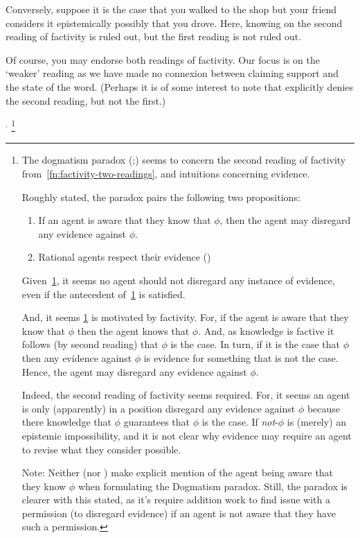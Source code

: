 \begin{note}
{    Conversely, suppose it is the case that you walked to the shop but your friend considers it epistemically possibly that you drove.
    Here, knowing on the second reading of factivity is ruled out, but the first reading is not ruled out.

    Of course, you may endorse both readings of factivity.
    Our focus is on the `weaker' reading as we have made no connexion between claiming support and the state of the word.
    (Perhaps it is of some interest to note that \citeauthor{Dretske:1970to} explicitly denies the second reading, but not the first.)
  }\(^{,}\)\nolinebreak
  \footnote{
    The dogmatism paradox (\cite[39,43--45]{Kripke:2011wv};\cite[148]{Harman:1973ww}) seems to concern the second reading of factivity from~\autoref{fn:factivity-two-readings}, and intuitions concerning evidence.

  Roughly stated, the paradox pairs the following two propositions:
  \begin{enumerate}[label=D\arabic*., ref=(D\arabic*)]
  \item\label{dog:1} If an agent is aware that they know that \(\phi\), then the agent may disregard any evidence against \(\phi\).
  \item\label{dog:2} Rational agents respect their evidence
    (\cite[Cf.][\S2]{Kelly:2016wk})
  \end{enumerate}
  Given~\ref{dog:2}, it seems no agent should not disregard any instance of evidence, even if the antecedent of~\ref{dog:1} is satisfied.

  And, it seems \ref{dog:1} is motivated by factivity.
  For, if the agent is aware that they know that \(\phi\) then the agent knows that \(\phi\).
  And, as knowledge is factive it follows (by second reading) that \(\phi\) is the case.
  In turn, if it is the case that \(\phi\) then any evidence against \(\phi\) is evidence for something that is not the case.
  Hence, the agent may disregard any evidence against \(\phi\).


  Indeed, the second reading of factivity seems required.
  For, it seems an agent is only (apparently) in a position disregard any evidence against \(\phi\) because there knowledge that \(\phi\) guarantees that \(\phi\) is the case.
  If \emph{not}-\(\phi\) is (merely) an epistemic impossibility, and it is not clear why evidence may require an agent to revise what they consider possible.

  Note:
  Neither \citeauthor{Kripke:2011wv} (nor \citeauthor{Harman:1973ww}) make explicit mention of the agent being aware that they know \(\phi\) when formulating the Dogmatism paradox.
      Still, the paradox is clearer with this stated, as it's require addition work to find issue with a permission (to disregard evidence) if an agent is not aware that they have such a permission.

}
\end{note}
